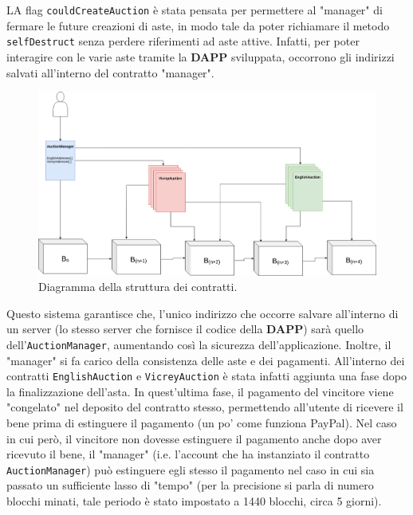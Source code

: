 LA flag \texttt{couldCreateAuction} è stata pensata per permettere al "manager" di fermare le future creazioni di aste, in modo tale da poter richiamare il metodo \texttt{selfDestruct} senza perdere riferimenti ad aste attive. Infatti, per poter interagire con le varie aste tramite la \textbf{DAPP} sviluppata, occorrono gli indirizzi salvati all'interno del contratto "manager".\newline
\begin{figure}[h]
	\centering
	\includegraphics[scale=0.3]{contratti.png}
	\caption{Diagramma della struttura dei contratti.}\label{fig1.1}
\end{figure}\newline
Questo sistema garantisce che, l'unico indirizzo che occorre salvare all'interno di un server (lo stesso server che fornisce il codice della \textbf{DAPP}) sarà quello dell'\texttt{AuctionManager}, aumentando così la sicurezza dell'applicazione. Inoltre, il "manager" si fa carico della consistenza delle aste e dei pagamenti. All'interno dei contratti \texttt{EnglishAuction} e \texttt{VicreyAuction} è stata infatti aggiunta una fase dopo la finalizzazione dell'asta. In quest'ultima fase, il pagamento del vincitore viene "congelato" nel deposito del contratto stesso, permettendo all'utente di ricevere il bene prima di estinguere il pagamento (un po' come funziona PayPal). Nel caso in cui però, il vincitore non dovesse estinguere il pagamento anche dopo aver ricevuto il bene, il "manager" (i.e. l'account che ha instanziato il contratto \texttt{AuctionManager}) può estinguere egli stesso il pagamento nel caso in cui sia passato un sufficiente lasso di "tempo" (per la precisione si parla di numero blocchi minati, tale periodo è stato impostato a 1440 blocchi, circa 5 giorni).\newline
